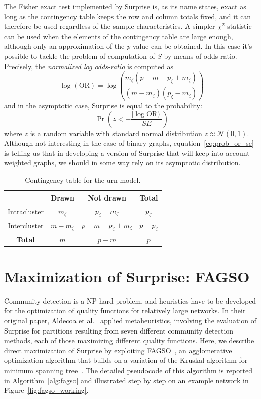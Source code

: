 The Fisher exact test implemented by Surprise is, as its name states, exact as long as the contingency table keeps the row and column totals fixed, and it can therefore be used regardless of the sample characteristics. A simpler $\chi^2$ statistic can be used when the elements of the contingency table are large enough, although only an approximation of the \emph{p}-value can be obtained.
In this case it's possible to tackle the problem of computation of $S$ by means of odds-ratio. Precisely, the \emph{normalized log odds-ratio} is computed as 
\begin{equation}
\log(\textrm{OR}) = \log\left( \frac{m_\zeta(p-m-p_\zeta+m_\zeta)}{(m-m_\zeta)(p_\zeta-m_\zeta)} \right )
\end{equation}
and in the asymptotic case, Surprise is equal to the probability:
\begin{equation}\label{eq:prob_or_se}
\Pr\left(z < -\frac{|\log\textrm{OR})|}{SE} \right)
\end{equation}
where $z$ is a random variable with standard normal distribution $z \approx \mathcal{N}(0,1)$.
Although not interesting in the case of binary graphs, equation~\ref{eq:prob_or_se} is telling us that in developing a version of Surprise that will keep into account weighted graphs, we should in some way rely on its asymptotic distribution.

\begin{table}[htb!]
\centering
\begin{tabular}{|c|c|c|c|}
\hline
 & Drawn & Not drawn & \textbf{Total}\\
\hline
Intracluster & $m_\zeta$ & $p_\zeta-m_\zeta$ & $p_\zeta$\\
\hline
Intercluster & $m-m_\zeta$ & $p-m-p_\zeta+m_\zeta$ & $p-p_\zeta$ \\
\hline
\textbf{Total} & $m$ & $p-m$ & $p$ \\
\hline
\end{tabular}
\caption{Contingency table for the urn model.}
\label{tab:contingency_table}
\end{table}

\section{Maximization of Surprise: FAGSO}\label{sec:max_surprise_fagso}

Community detection is a NP-hard problem, and heuristics have to be developed for the optimization of quality functions for relatively large networks. In their original paper, Aldecoa et al.~\cite{aldecoa2011} applied metaheuristics, involving the evaluation of Surprise for partitions resulting from seven different community detection methods, each of those maximizing different quality functions.
Here, we describe direct maximization of Surprise by exploiting FAGSO~\cite{jiang2014}, an agglomerative optimization algorithm that builds on a variation of the Kruskal algorithm for minimum spanning tree~\cite{leiserson2001}.
The detailed pseudocode of this algorithm is reported in Algorithm~\ref{alg:fagso} and illustrated step by step on an example network in Figure~\ref{fig:fagso_working}.

